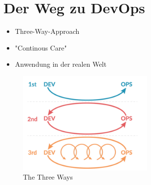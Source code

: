 \chapter{Der Weg zu DevOps} %

\begin{itemize}
\item Three-Way-Approach
\item "Continous Care"
\item Anwendung in der realen Welt
\end{itemize}

\begin{figure}[h]
\centering
\includegraphics[width=0.6\textwidth]{Graphics/three_ways}
\caption{The Three Ways \cite{curra:2020}}
\end{figure}
